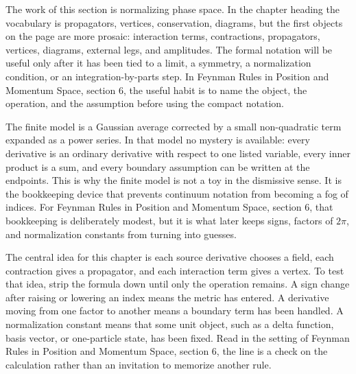 











The work of this section is normalizing phase space.  In the chapter heading the vocabulary is propagators, vertices, conservation, diagrams, but the first objects on the page are more prosaic: interaction terms, contractions, propagators, vertices, diagrams, external legs, and amplitudes.  The formal notation will be useful only after it has been tied to a limit, a symmetry, a normalization condition, or an integration-by-parts step.  In Feynman Rules in Position and Momentum Space, section 6, the useful habit is to name the object, the operation, and the assumption before using the compact notation.

The finite model is a Gaussian average corrected by a small non-quadratic term expanded as a power series.  In that model no mystery is available: every derivative is an ordinary derivative with respect to one listed variable, every inner product is a sum, and every boundary assumption can be written at the endpoints.  This is why the finite model is not a toy in the dismissive sense.  It is the bookkeeping device that prevents continuum notation from becoming a fog of indices.  For Feynman Rules in Position and Momentum Space, section 6, that bookkeeping is deliberately modest, but it is what later keeps signs, factors of \(2\pi\), and normalization constants from turning into guesses.

The central idea for this chapter is each source derivative chooses a field, each contraction gives a propagator, and each interaction term gives a vertex.  To test that idea, strip the formula down until only the operation remains.  A sign change after raising or lowering an index means the metric has entered.  A derivative moving from one factor to another means a boundary term has been handled.  A normalization constant means that some unit object, such as a delta function, basis vector, or one-particle state, has been fixed.  Read in the setting of Feynman Rules in Position and Momentum Space, section 6, the line is a check on the calculation rather than an invitation to memorize another rule.


